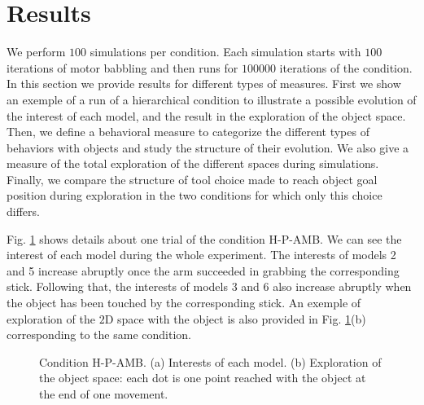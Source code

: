 \documentclass[10pt,letterpaper]{article}
\begin{document}
	
%


\section{Results}
	
	We perform $100$ simulations per condition. 
	Each simulation starts with $100$ iterations of motor babbling and then runs for $100000$ iterations of the condition.
	In this section we provide results for different types of measures. 
	First we show an exemple of a run of a hierarchical condition to illustrate a possible evolution of the interest of each model, and the result in the exploration of the object space.
	Then, we define a behavioral measure to categorize the different types of behaviors with objects and study the structure of their evolution.
	We also give a measure of the total exploration of the different spaces during simulations.
	Finally, we compare the structure of tool choice made to reach object goal position during exploration in the two conditions for which only this choice differs.
		
	Fig. \ref{res_interests} shows details about one trial of the condition H-P-AMB. 
	We can see the interest of each model during the whole experiment.
	The interests of models 2 and 5 increase abruptly once the arm succeeded in grabbing the corresponding stick.
	Following that, the interests of models 3 and 6 also increase abruptly when the object has been touched by the corresponding stick.
	An exemple of exploration of the $2$D space with the object is also provided in Fig. \ref{res_interests}(b) corresponding to the same condition.
	
	\begin{figure}[ht]
		\centering
		\caption{Condition H-P-AMB. (a) Interests of each model. (b) Exploration of the object space: each dot is one point reached with the object at the end of one movement.}
		\label{res_interests}
	\end{figure}
\end{document}
